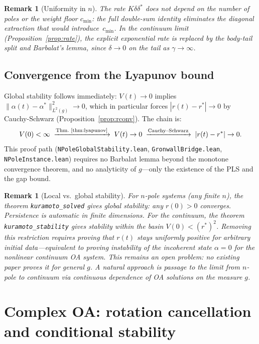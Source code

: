 \documentclass[11pt,a4paper]{article}
\newtheorem{remark}[theorem]{Remark}
\theoremstyle{definition}
\begin{document}
\begin{remark}[Uniformity in $n$]
The rate $K\delta\delta^*$ does not depend on the number of poles or the weight floor $c_{\min}$: the full double-sum identity eliminates the diagonal extraction that would introduce~$c_{\min}$. In the continuum limit (Proposition~\ref{prop:rate}), the explicit exponential rate is replaced by the body-tail split and Barbalat's lemma, since $\delta \to 0$ on the tail as $\gamma \to \infty$.
\end{remark}

\subsection{Convergence from the Lyapunov bound}

Global stability follows immediately: $V(t) \to 0$ implies $\|\alpha(t) - \alpha^*\|^2_{L^2(g)} \to 0$, which in particular forces $|r(t) - r^*| \to 0$ by Cauchy-Schwarz (Proposition~\ref{prop:rconv}). The chain is:
\[
V(0) < \infty \;\xrightarrow{\text{Thm.~\ref{thm:lyapunov}}}\; V(t) \to 0 \;\xrightarrow{\text{Cauchy--Schwarz}}\; |r(t) - r^*| \to 0.
\]
This proof path (\texttt{NPoleGlobalStability.lean}, \texttt{GronwallBridge.lean}, \texttt{NPoleInstance.lean}) requires no Barbalat lemma beyond the monotone convergence theorem, and no analyticity of $g$---only the existence of the PLS and the gap bound.

\begin{remark}[Local vs.\ global stability]
For $n$-pole systems (any finite $n$), the theorem \texttt{kuramoto\_solved} gives \emph{global} stability: any $r(0) > 0$ converges. Persistence is automatic in finite dimensions. For the continuum, the theorem \texttt{kuramoto\_stability} gives stability within the basin $V(0) < (r^*)^2$. Removing this restriction requires proving that $r(t)$ stays uniformly positive for arbitrary initial data---equivalent to proving instability of the incoherent state $\alpha = 0$ for the nonlinear continuum OA system. This remains an open problem: no existing paper proves it for general $g$. A natural approach is passage to the limit from $n$-pole to continuum via continuous dependence of OA solutions on the measure $g$.
\end{remark}

\section{Complex OA: rotation cancellation and conditional stability}\label{sec:complex-extension}
\end{document}
